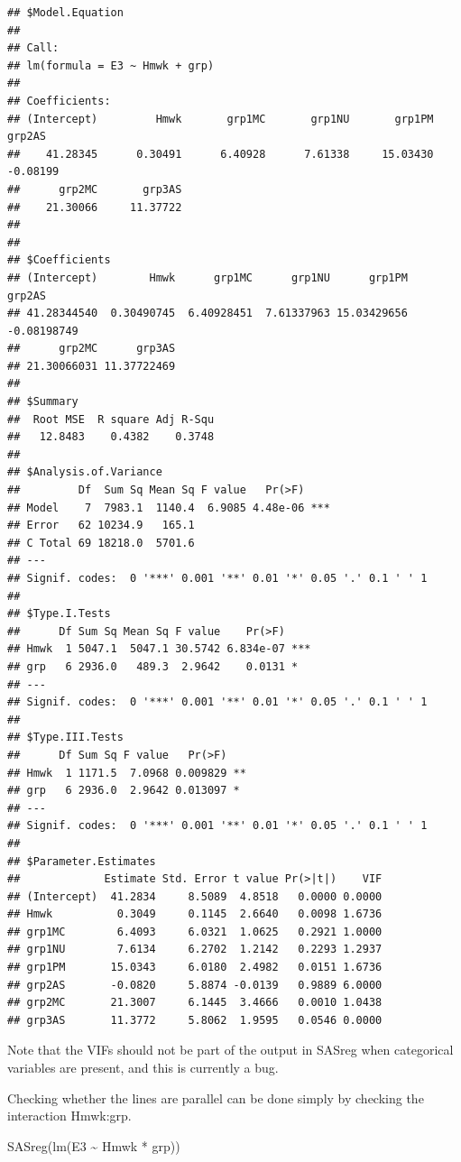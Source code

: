 \documentclass[
]{book}
\newenvironment{Shaded}{\begin{snugshade}}{\end{snugshade}}
\newcommand{\FunctionTok}[1]{\textcolor[rgb]{0.00,0.00,0.00}{#1}}
\newcommand{\NormalTok}[1]{#1}
\newcommand{\SpecialCharTok}[1]{\textcolor[rgb]{0.00,0.00,0.00}{#1}}
\begin{document}
\begin{verbatim}
## $Model.Equation
## 
## Call:
## lm(formula = E3 ~ Hmwk + grp)
## 
## Coefficients:
## (Intercept)         Hmwk       grp1MC       grp1NU       grp1PM       grp2AS  
##    41.28345      0.30491      6.40928      7.61338     15.03430     -0.08199  
##      grp2MC       grp3AS  
##    21.30066     11.37722  
## 
## 
## $Coefficients
## (Intercept)        Hmwk      grp1MC      grp1NU      grp1PM      grp2AS 
## 41.28344540  0.30490745  6.40928451  7.61337963 15.03429656 -0.08198749 
##      grp2MC      grp3AS 
## 21.30066031 11.37722469 
## 
## $Summary
##  Root MSE  R square Adj R-Squ 
##   12.8483    0.4382    0.3748 
## 
## $Analysis.of.Variance
##         Df  Sum Sq Mean Sq F value   Pr(>F)    
## Model    7  7983.1  1140.4  6.9085 4.48e-06 ***
## Error   62 10234.9   165.1                     
## C Total 69 18218.0  5701.6                     
## ---
## Signif. codes:  0 '***' 0.001 '**' 0.01 '*' 0.05 '.' 0.1 ' ' 1
## 
## $Type.I.Tests
##      Df Sum Sq Mean Sq F value    Pr(>F)    
## Hmwk  1 5047.1  5047.1 30.5742 6.834e-07 ***
## grp   6 2936.0   489.3  2.9642    0.0131 *  
## ---
## Signif. codes:  0 '***' 0.001 '**' 0.01 '*' 0.05 '.' 0.1 ' ' 1
## 
## $Type.III.Tests
##      Df Sum Sq F value   Pr(>F)   
## Hmwk  1 1171.5  7.0968 0.009829 **
## grp   6 2936.0  2.9642 0.013097 * 
## ---
## Signif. codes:  0 '***' 0.001 '**' 0.01 '*' 0.05 '.' 0.1 ' ' 1
## 
## $Parameter.Estimates
##             Estimate Std. Error t value Pr(>|t|)    VIF
## (Intercept)  41.2834     8.5089  4.8518   0.0000 0.0000
## Hmwk          0.3049     0.1145  2.6640   0.0098 1.6736
## grp1MC        6.4093     6.0321  1.0625   0.2921 1.0000
## grp1NU        7.6134     6.2702  1.2142   0.2293 1.2937
## grp1PM       15.0343     6.0180  2.4982   0.0151 1.6736
## grp2AS       -0.0820     5.8874 -0.0139   0.9889 6.0000
## grp2MC       21.3007     6.1445  3.4666   0.0010 1.0438
## grp3AS       11.3772     5.8062  1.9595   0.0546 0.0000
\end{verbatim}

Note that the VIFs should not be part of the output in SASreg when categorical variables are present, and this is currently a bug.

Checking whether the lines are parallel can be done simply by checking the interaction Hmwk:grp.

\begin{Shaded}
\begin{Highlighting}[]
\FunctionTok{SASreg}\NormalTok{(}\FunctionTok{lm}\NormalTok{(E3 }\SpecialCharTok{\textasciitilde{}}\NormalTok{ Hmwk }\SpecialCharTok{*}\NormalTok{ grp))}
\end{Highlighting}
\end{Shaded}
\end{document}
